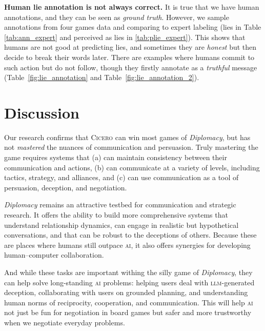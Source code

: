 \documentclass[oneside]{memoir}
\newcommand{\cicero}{\abr{Cicero} }
\newcommand{\abr}[1]{\textsc{#1}}
\begin{document}
\textbf{Human lie annotation is not always correct.} It is true that we have human annotations, and they can be seen as \textit{ground truth}. However, we sample annotations from four games data and comparing to expert labeling (lies in Table \ref{tab:ann_expert} and perceived as lies in \ref{tab:plie_expert}). This shows that humans are not good at predicting lies, and sometimes they are \textit{honest} but then decide to break their words later.
%
There are examples where humans commit to such action but do not follow, though they firstly annotate as a \textit{truthful} message (Table~\ref{fig:lie_annotation} and Table~\ref{fig:lie_annotation_2}).

\section{Discussion}
\label{sec:conc}

Our research confirms that \cicero{} can win most games of \textit{Diplomacy}, but has not \emph{mastered} the nuances of communication and persuasion.
%
Truly mastering the game requires systems that (a) can maintain
consistency between their communication and actions, (b) can
communicate at a variety of levels, including tactics, strategy, and
alliances, and (c) can use communication as a tool of persuasion,
deception, and negotiation.

\textit{Diplomacy} remains an attractive testbed for communication and strategic research.
%
It offers the ability to build more comprehensive systems that understand relationship dynamics, can engage in realistic but hypothetical conversations, and that can be robust to the deceptions of others.
%
Because these are places where humans still outpace \abr{ai}, it also offers synergies for developing human--computer collaboration.

And while these tasks are important withing the silly game of \textit{Diplomacy}, they can help solve long-standing \abr{ai} problems:
%
helping users deal with \abr{llm}-generated deception,
%
collaborating with users on grounded planning,
%
and understanding human norms of reciprocity, cooperation, and communication.
%
This will help \abr{ai} not just be fun for negotiation in board games but safer and more trustworthy when we negotiate everyday problems.
\end{document}
